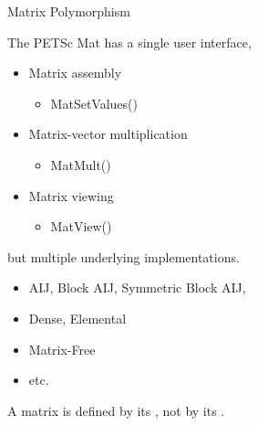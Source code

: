 \begin{frame}{Matrix Polymorphism}

The PETSc {\kb Mat} has a single user interface,
\begin{itemize}
  \item Matrix assembly
  \begin{itemize}
    \item {\kb MatSetValues()}
  \end{itemize}

  \item Matrix-vector multiplication
  \begin{itemize}
    \item {\kb MatMult()}
  \end{itemize}

  \item Matrix viewing
  \begin{itemize}
    \item {\kb MatView()}
  \end{itemize}
\end{itemize}
but multiple underlying implementations.
\begin{itemize}
  \item AIJ, Block AIJ, Symmetric Block AIJ,
  \item Dense, Elemental
  \item Matrix-Free
  \item etc.
\end{itemize}
A matrix is defined by its {}, not by its {}.

\end{frame}
